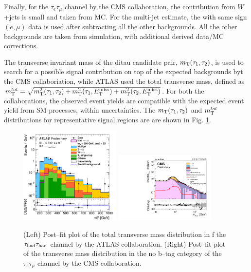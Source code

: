 Finally, for the $\tau_{e}\tau_{\mu}$ channel by the CMS collaboration, the contribution from $W$+jets is small and taken from MC. For the multi-jet estimate,  the with same sign $(e,\mu)$ data is used after subtracting all the other backgrounds. All the other backgrounds are taken from simulation, with additional derived data/MC corrections.

The transverse invariant mass of the ditau candidate pair, $m_{\rm T}(\tau_{1},\tau_{2})$, is used to search for a possible
signal contribution on top of the expected backgrounds byt the CMS collaboriation, while ATLAS used the total transverse mass, defined as $m_{\rm T}^{tot}=\sqrt{m_{\rm T}^{2}(\tau_{1},\tau_{2})+m_{\rm T}^{2}(\tau_{1},E_{\rm T}^{\rm miss})+m_{\rm T}^{2}(\tau_{2},E_{\rm T}^{\rm miss})}$. 
For both the collaborations, the observed event yields are compatible with the expected event yield from SM processes, within uncertainties. The $m_{\rm T}(\tau_{1},\tau_{2})$ and $m_{\rm T}^{tot}$ distributions for representative signal regions are  are shown in Fig. \ref{fig_1Htautau}.
\begin{figure}
\centering
\includegraphics[width=0.45\textwidth, angle=0] {figures/fig_1Htautau_a.pdf}
\includegraphics[width=0.45\textwidth, angle=0] {figures/fig_1Htautau_b.pdf}
\caption{ (Left) Post--fit plot of the total transverse mass distribution in f the $\tau_{\rm had}\tau_{\rm had}$ channel by the ATLAS collaboration. (Right) Post--fit plot of the transverse mass distribution in the no b--tag category of the $\tau_{e}\tau_{\mu}$ channel by the CMS collaboration.}
\label{fig_1Htautau}   
\end{figure}

